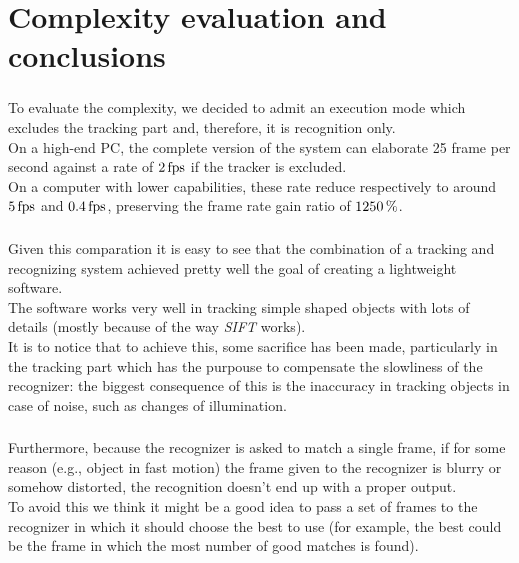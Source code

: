 \documentclass{beamer}
\begin{document}
  \section{Complexity evaluation and conclusions}

  \begin{frame}
    \frametitle{\insertsection}
	To evaluate the complexity, we decided to admit an execution mode which
	excludes the tracking part and, therefore, it is recognition only.\\
	On a high-end PC, the complete version of the system can elaborate 25 frame
    per second against a rate of $\unit[2]{fps}$ if the tracker is excluded.\\
    On a computer with lower capabilities, these rate reduce respectively to
    around $\unit[5]{fps}$ and $\unit[0.4]{fps}$, preserving the frame rate
    gain ratio of $\unit[1250]{\%}$.\\
  \end{frame}

  \begin{frame}
    \frametitle{\insertsection}
    Given this comparation it is easy to see that the combination of a tracking
	and recognizing system achieved pretty well the goal of creating a
    lightweight software.\\
    The software works very well in tracking simple shaped objects with lots of
    details (mostly because of the way \emph{SIFT} works).\\
    It is to notice that to achieve this, some sacrifice has been made,
    particularly in the tracking part which has the purpouse to compensate
    the slowliness of the recognizer: the biggest consequence of this is
    the inaccuracy in tracking objects in case of noise, such as changes of
    illumination.\\
  \end{frame}

  \begin{frame}
    \frametitle{\insertsection}
 	Furthermore, because the recognizer is asked to match a single frame, if for
	some reason (e.g., object in fast motion) the frame given to the recognizer
    is blurry or somehow distorted, the recognition doesn't end up with a proper
	output.\\
	To avoid this we think it might be a good idea to pass a set of frames to
	the recognizer in which it should choose the best to use (for example,
	the best could be the frame in which the most number of good matches
	is found).\\
  \end{frame}
\end{document}
